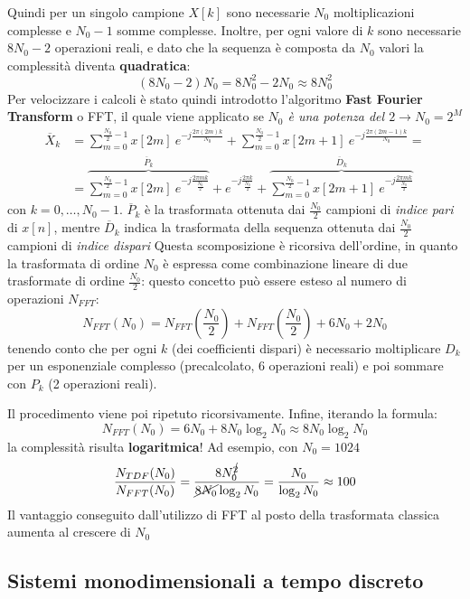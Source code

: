 \documentclass[
]{article}
\begin{document}
\begin{enumerate}
  Quindi per un singolo campione \(X[k]\) sono necessarie \(N_0\)
  moltiplicazioni complesse e \(N_0 -1\) somme complesse. Inoltre, per
  ogni valore di \(k\) sono necessarie \(8N_0 -2\) operazioni reali, e
  dato che la sequenza è composta da \(N_0\) valori la complessità
  diventa \textbf{quadratica}: \[
  (8N_0 -2)N_0 = 8N_{0}^{2} -2N_0 \approx 8N_{0}^2
  \] Per velocizzare i calcoli è stato quindi introdotto l'algoritmo
  \textbf{Fast Fourier Transform} o FFT, il quale viene applicato se
  \emph{\(N_0\) è una potenza del \(2 \to N_0 = 2^{M}\)} \begin{align*}
  \overline{X}_k &= \sum_{m=0}^{\frac{N_0}{2}-1} x[2m]\ e^{-j\frac{2\pi(2m)k}{N_0}} + \sum_{m=0}^{\frac{N_0}{2}-1} x[2m+1] \ e^{-j\frac{2\pi(2m-1)k}{N_0}}= \\
  & = \overbrace{\sum_{m=0}^{\frac{N_0}{2}-1} x[2m]\ e^{-j\frac{2\pi mk}{\frac{N_0}{2}}}}^{\overline{P}_k}+e^{-j\frac{2\pi k}{\frac{N_0}{2}}} + \overbrace{\sum_{m=0}^{\frac{N_0}{2}-1} x[2m+1] \ e^{-j\frac{2\pi mk}{\frac{N_0}{2}}}}^{\overline{D}_k}
  \end{align*} con \(k= 0, \dots , N_0 -1\). \(\overline{P}_k\) è la
  trasformata ottenuta dai \(\frac{N_0}{2}\) campioni di \emph{indice
  pari} di \(x[n]\), mentre \(\overline{D}_k\) indica la trasformata
  della sequenza ottenuta dai \(\frac{N_0}{2}\) campioni di \emph{indice
  dispari} Questa scomposizione è ricorsiva dell'ordine, in quanto la
  trasformata di ordine \(N_0\) è espressa come combinazione lineare di
  due trasformate di ordine \(\frac{N_0}{2}\): questo concetto può
  essere esteso al numero di operazioni \(N_{FFT}\): \[
  N_{FFT}(N_0)=N_{FFT}(\frac{N_0}{2})+N_{FFT}(\frac{N_0}{2})+6N_0 + 2N_0
  \] tenendo conto che per ogni \(k\) (dei coefficienti dispari) è
  necessario moltiplicare \(D_k\) per un esponenziale complesso
  (precalcolato, 6 operazioni reali) e poi sommare con \(P_k\) (2
  operazioni reali).

  Il procedimento viene poi ripetuto ricorsivamente. Infine, iterando la
  formula: \[
  N_{FFT}(N_0) = 6N_0 + 8N_0\log_2 N_0 \approx 8N_0 \log_2 N_0
  \] la complessità risulta \textbf{logaritmica}! Ad esempio, con
  \(N_0=1024\) \[
  \frac{N_{TDF}(N_0)}{N_{FFT}(N_0)} = \frac{8N_{0}^{\cancel{2}}}{\cancel{8N_0}\log_2 N_0} = \frac{N_0}{\log_2 N_0} \approx 100
  \] Il vantaggio conseguito dall'utilizzo di FFT al posto della
  trasformata classica aumenta al crescere di \(N_0\)
\end{enumerate}

\subsection{Sistemi monodimensionali a tempo
discreto}\label{sistemi-monodimensionali-a-tempo-discreto}
\end{document}

